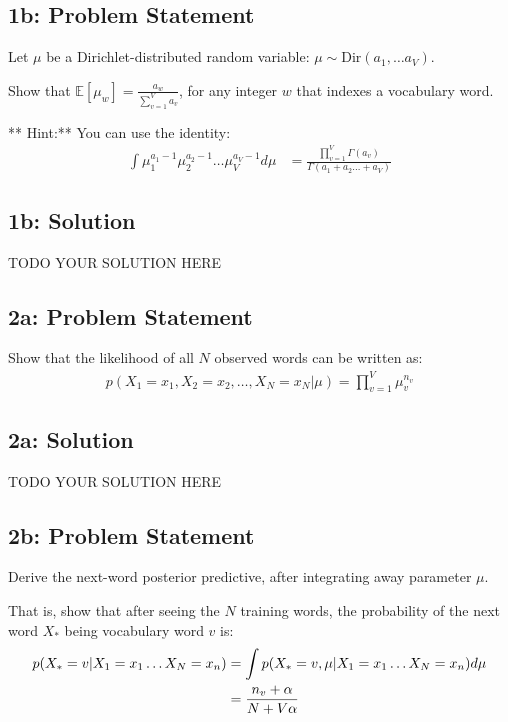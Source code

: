 \documentclass[10pt]{article}
\newcommand{\officialdirections}[1]{{\color{purple} #1}}
\begin{document}
\officialdirections{
\subsection*{1b: Problem Statement}

Let $\mu$ be a Dirichlet-distributed random variable: $\mu \sim \text{Dir}(a_1, \ldots a_V)$. 

Show that $\mathbb{E}[ \mu_w ] = \frac{a_w}{\sum_{v=1}^V a_v}$, for any integer $w$ that indexes a vocabulary word.

** Hint:** You can use the identity:
\begin{align}
\int \mu_1^{a_1-1} \mu_2^{a_2 - 1} \ldots \mu_V^{a_V-1} d\mu
 &= \frac
 	{\prod_{v=1}^V \Gamma(a_v)}
 	{\Gamma(a_1 + a_2 \ldots + a_V)}
\end{align}
}

\subsection{1b: Solution}
TODO YOUR SOLUTION HERE

\officialdirections{
\subsection*{2a: Problem Statement}

Show that the likelihood of all $N$ observed words can be written as:
\begin{align}
p(X_1 = x_1, X_2 = x_2, \ldots, X_N = x_N | \mu) = \prod_{v=1}^V \mu_v^{n_v}
\end{align}
}

\subsection{2a: Solution}
TODO YOUR SOLUTION HERE

\officialdirections{
\subsection*{2b: Problem Statement}

Derive the next-word posterior predictive, after integrating away parameter $\mu$.

That is, show that after seeing the $N$ training words, the probability of the next word $X_*$ being vocabulary word $v$ is:
\begin{align}
p( X_* = v | X_1 = x_1 \ldots X_N = x_n)
	&= \int p( X_* = v, \mu | X_1 = x_1 \ldots X_N = x_n) d\mu
\notag \\
	&= \frac{n_v + \alpha}{N + V\alpha}
\end{align}
}
\end{document}
